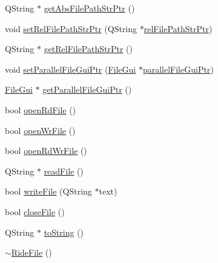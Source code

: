\begin{DoxyCompactItemize}
Q\-String $\ast$ \hyperlink{class_ride_file_a0e96d5abf1b300f9d0e4d144f67cfc2f}{get\-Abs\-File\-Path\-Str\-Ptr} ()
\item 
void \hyperlink{class_ride_file_a7a402ae26fc1da036027520d14e03820}{set\-Rel\-File\-Path\-Str\-Ptr} (Q\-String $\ast$\hyperlink{class_ride_file_a47152ef70bd5486c4cbaa5c12e5346d4}{rel\-File\-Path\-Str\-Ptr})
\item 
Q\-String $\ast$ \hyperlink{class_ride_file_a2e611b2f3bc3243be2d90e2927a4154c}{get\-Rel\-File\-Path\-Str\-Ptr} ()
\item 
void \hyperlink{class_ride_file_a39a0ef3eee339b3ee3899f33e55995f7}{set\-Parallel\-File\-Gui\-Ptr} (\hyperlink{class_file_gui}{File\-Gui} $\ast$\hyperlink{class_ride_file_ab2a6a17fda833b6e592968cde2aa18dc}{parallel\-File\-Gui\-Ptr})
\item 
\hyperlink{class_file_gui}{File\-Gui} $\ast$ \hyperlink{class_ride_file_af4cf263a9d095291629dc3660637e420}{get\-Parallel\-File\-Gui\-Ptr} ()
\item 
bool \hyperlink{class_ride_file_a2267c2484dc39c1d88ce2a3442f38911}{open\-Rd\-File} ()
\item 
bool \hyperlink{class_ride_file_ad44563920fa9e08e89a408bab61e426b}{open\-Wr\-File} ()
\item 
bool \hyperlink{class_ride_file_a8ea5dceaf41263bc16bfb7976bb79772}{open\-Rd\-Wr\-File} ()
\item 
Q\-String $\ast$ \hyperlink{class_ride_file_a1cbf0dec5da9196f49bdcd4301247bc4}{read\-File} ()
\item 
bool \hyperlink{class_ride_file_a6cf06554699cf8bcbcaa4dc81ba4e6bd}{write\-File} (Q\-String $\ast$text)
\item 
bool \hyperlink{class_ride_file_a085e690a03feb6293c2be03213af4312}{close\-File} ()
\item 
Q\-String $\ast$ \hyperlink{class_ride_file_ae474654126f9999afb15d754c21819fd}{to\-String} ()
\item 
\hyperlink{class_ride_file_a829715bb4b2df9f587e6b5bdfded4c95}{$\sim$\-Ride\-File} ()
\end{DoxyCompactItemize}
